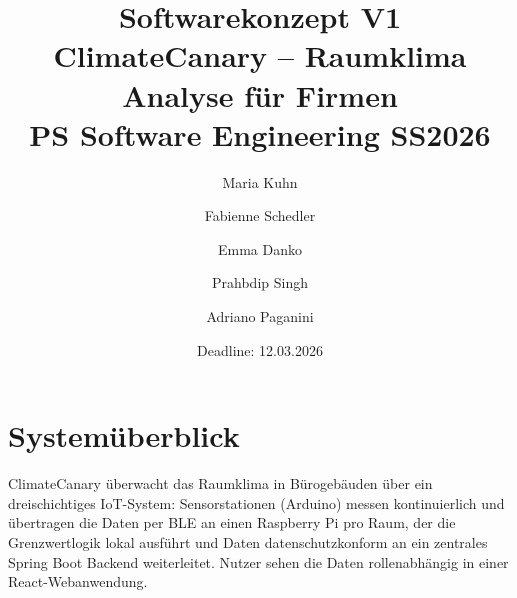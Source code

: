 \documentclass[12pt,a4paper]{article}
\title{\textbf{Softwarekonzept V1}\\

\large ClimateCanary -- Raumklima Analyse für Firmen\\

PS Software Engineering SS2026}
\date{Deadline: 12.03.2026}
\author{
  Maria Kuhn \and Fabienne Schedler \and Emma Danko \and Prahbdip Singh \and Adriano Paganini
}
\begin{document}
\maketitle

\tableofcontents
\newpage

\section{Systemüberblick}

ClimateCanary überwacht das Raumklima in Bürogebäuden über ein dreischichtiges
IoT-System: Sensorstationen (Arduino) messen kontinuierlich und übertragen die Daten
per BLE an einen Raspberry Pi pro Raum, der die Grenzwertlogik lokal ausführt und
Daten datenschutzkonform an ein zentrales Spring Boot Backend weiterleitet. Nutzer
sehen die Daten rollenabhängig in einer React-Webanwendung.
\end{document}
